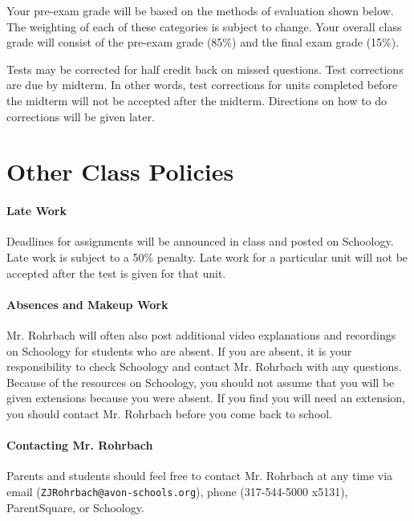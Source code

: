 \documentclass[9pt]{exam}
\begin{document}
Your pre-exam grade will be based on the methods of evaluation shown below. The 
weighting of each of these categories is subject to change. Your overall class 
grade will consist of the pre-exam grade (85\%) and the final exam grade (15\%).

\begin{center}
\end{center}

Tests may be corrected for half credit back on missed questions.  Test corrections are due 
by midterm.  In other words, test corrections for units completed before the midterm will 
not be accepted after the midterm.  Directions on how to do corrections will be given later.






\section*{Other Class Policies}

\paragraph{Late Work}
	Deadlines for assignments will be announced in class and posted on Schoology.  Late work 
	is subject to a 50\% penalty.  Late work for a particular unit will not be accepted after
	the test is given for that unit.

\paragraph{Absences and Makeup Work}
	Mr. Rohrbach will often also post additional video explanations and recordings on Schoology for
	students who are absent.  If you are absent, it is your responsibility to check Schoology and
	contact Mr. Rohrbach with any questions.  Because of the resources on Schoology, you should not
	assume that you will be given extensions because you were absent. If you find you will need an
	extension, you should contact Mr. Rohrbach before you come back to school. 

\paragraph{Contacting Mr. Rohrbach}
	Parents and students should feel free to contact Mr. Rohrbach at any time via email 
	(\texttt{ZJRohrbach@avon-schools.org}), phone (317-544-5000 x5131), \mbox{ParentSquare}, 
	or Schoology.
\end{document}
